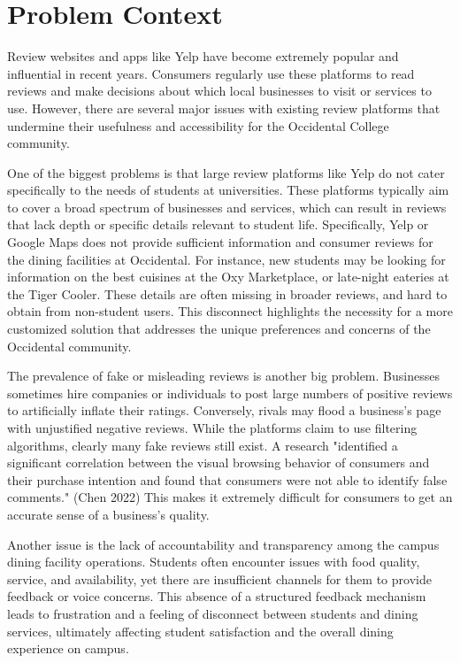 \documentclass[10pt,twocolumn]{article}
\begin{document}
\section{Problem Context}
Review websites and apps like Yelp have become extremely popular and influential in recent years. Consumers regularly use these platforms to read reviews and make decisions about which local businesses to visit or services to use. However, there are several major issues with existing review platforms that undermine their usefulness and accessibility for the Occidental College community.

One of the biggest problems is that large review platforms like Yelp do not cater specifically to the needs of students at universities. These platforms typically aim to cover a broad spectrum of businesses and services, which can result in reviews that lack depth or specific details relevant to student life. Specifically, Yelp or Google Maps does not provide sufficient information and consumer reviews for the dining facilities at Occidental. For instance, new students may be looking for information on the best cuisines at the Oxy Marketplace, or late-night eateries at the Tiger Cooler. These details are often missing in broader reviews, and hard to obtain from non-student users. This disconnect highlights the necessity for a more customized solution that addresses the unique preferences and concerns of the Occidental community.

The prevalence of fake or misleading reviews is another big problem. Businesses sometimes hire companies or individuals to post large numbers of positive reviews to artificially inflate their ratings. Conversely, rivals may flood a business's page with unjustified negative reviews. While the platforms claim to use filtering algorithms, clearly many fake reviews still exist. A research "identified a significant correlation between the visual browsing behavior of consumers and their purchase intention and found that consumers were not able to identify false comments." (Chen 2022) This makes it extremely difficult for consumers to get an accurate sense of a business's quality.

Another issue is the lack of accountability and transparency among the campus dining facility operations. Students often encounter issues with food quality, service, and availability, yet there are insufficient channels for them to provide feedback or voice concerns. This absence of a structured feedback mechanism leads to frustration and a feeling of disconnect between students and dining services, ultimately affecting student satisfaction and the overall dining experience on campus.
\end{document}
